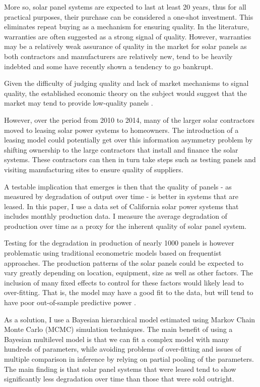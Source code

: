 \documentclass[12pt]{article}
\begin{document}
More so, solar panel systems are expected to last at least 20 years, thus for all practical purposes, their purchase can be considered a one-shot investment. This eliminates repeat buying as a mechanism for ensuring quality. In the literature, warranties are often suggested as a strong signal of quality. However, warranties may be a relatively weak assurance of quality in the market for solar panels as both contractors and manufacturers are relatively new, tend to be heavily indebted and some have recently shown a tendency to go bankrupt.

Given the difficulty of judging quality and lack of market mechanisms to signal quality, the established economic theory on the subject would suggest that the market may tend to provide low-quality panels \citet{tirole_theory_1988}.

However, over the period from 2010 to 2014, many of the larger solar contractors moved to leasing solar power systems to homeowners. The introduction of a leasing model could potentially get over this information asymmetry problem by shifting ownership to the large contractors that install and finance the solar systems. These contractors can then in turn take steps such as testing panels and visiting manufacturing sites to ensure quality of suppliers.

A testable implication that emerges is then that the quality of panels - as measured by degradation of output over time - is better in systems that are leased.  In this paper, I use a data set of California solar power systems that includes monthly production data. I measure the average degradation of production over time as a proxy for the inherent quality of solar panel system.

Testing for the degradation in production of nearly 1000 panels is however problematic using traditional econometric models based on frequentist approaches. The production patterns of the solar panels could be expected to vary greatly depending on location, equipment, size as well as other factors. The inclusion of many fixed effects to control for these factors would likely lead to over-fitting. That is, the model may have a good fit to the data, but will tend to have poor out-of-sample predictive power \citep{gelman_bayesian_2013}.

As a solution, I use a Bayesian hierarchical model estimated using Markov Chain Monte Carlo (MCMC) simulation techniques. The main benefit of using a Bayesian multilevel model is that we can fit a complex model with many hundreds of parameters, while avoiding problems of over-fitting and issues of multiple comparison in inference by relying on partial pooling of the parameters. The main finding is that solar panel systems that were leased tend to show significantly less degradation over time than those that were sold outright.
\end{document}
